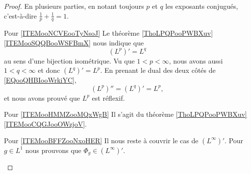 \begin{proof}
    En plusieurs parties, en notant toujours \( p\) et \( q\) les exposants conjugués, c'est-à-dire \( \frac{1}{ p }+\frac{1}{ q }=1\).
    \begin{subproof}
        \item[Pour \ref{ITEMooNCVEooTyNsoJ}]
            Le théorème \ref{ThoLPQPooPWBXuv}\ref{ITEMooSQQBooWSFBmX} nous indique que
            \begin{equation}        \label{EQooQHBIooWrkiYC}
                (L^p)'=L^q
            \end{equation}
            au sens d'une bijection isométrique. Vu que \( 1<p<\infty\), nous avons aussi \( 1<q<\infty\) et donc \( (L^q)'=L^p\). En prenant le dual des deux côtés de \eqref{EQooQHBIooWrkiYC}, 
            \begin{equation}
                (L^p)''=(L^q)'=L^p,
            \end{equation}
            et nous avons prouvé que \( L^p\) est réflexif.
        \item[Pour \ref{ITEMooHMMZooMQxWgB}]
            Il s'agit du théorème \ref{ThoLPQPooPWBXuv}\ref{ITEMooCQGJooOWzjoV}.
        \item[Pour \ref{ITEMooBFFZooNxoHER}\cite{MonCerveau}]
            Il nous reste à couvrir le cas de \( (L^{\infty})'\). Pour \( g\in L^1\) nous prouvons que \( \Phi_g\in (L^{\infty})'\). 
            

\end{subproof}
\end{proof}
